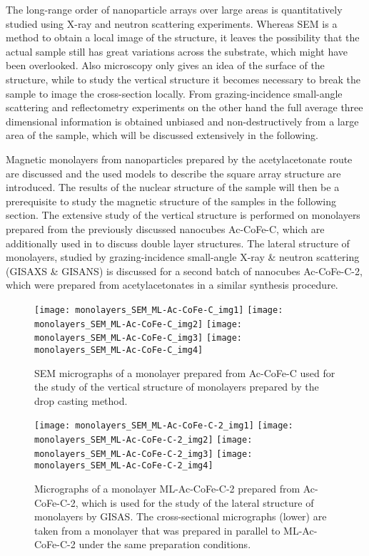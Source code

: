 \documentclass[\main/dresen_thesis.tex]{subfiles}
\begin{document}
  \label{sec:monolayers:structure:semIntro}
  The long-range order of nanoparticle arrays over large areas is quantitatively studied using X-ray and neutron scattering experiments.
  Whereas SEM is a method to obtain a local image of the structure, it leaves the possibility that the actual sample still has great variations across the substrate, which might have been overlooked.
  Also microscopy only gives an idea of the surface of the structure, while to study the vertical structure it becomes necessary to break the sample to image the cross-section locally.
  From grazing-incidence small-angle scattering and reflectometry experiments on the other hand the full average three dimensional information is obtained unbiased and non-destructively from a large area of the sample, which will be discussed extensively in the following.

  Magnetic monolayers from nanoparticles prepared by the acetylacetonate route are discussed and the used models to describe the square array structure are introduced.
  The results of the nuclear structure of the sample will then be a prerequisite to study the magnetic structure of the samples in the following section.
  The extensive study of the vertical structure is performed on monolayers prepared from the previously discussed nanocubes Ac-CoFe-C, which are additionally used in  to discuss double layer structures.
  The lateral structure of monolayers, studied by grazing-incidence small-angle X-ray \& neutron scattering (GISAXS \& GISANS) is discussed for a second batch of nanocubes Ac-CoFe-C-2, which were prepared from acetylacetonates in a similar synthesis procedure.

  \begin{figure}[tb]
    \centering
    \texttt{[image: monolayers\_SEM\_ML-Ac-CoFe-C\_img1]}
    \texttt{[image: monolayers\_SEM\_ML-Ac-CoFe-C\_img2]}
    \texttt{[image: monolayers\_SEM\_ML-Ac-CoFe-C\_img3]}
    \texttt{[image: monolayers\_SEM\_ML-Ac-CoFe-C\_img4]}
    \caption{\label{fig:monolayers:structure:semImagesMLACCoFeC}SEM micrographs of a monolayer prepared from Ac-CoFe-C used for the study of the vertical structure of monolayers prepared by the drop casting method.}
  \end{figure}

  \begin{figure}[tb]
    \centering
    \texttt{[image: monolayers\_SEM\_ML-Ac-CoFe-C-2\_img1]}
    \texttt{[image: monolayers\_SEM\_ML-Ac-CoFe-C-2\_img2]}
    \texttt{[image: monolayers\_SEM\_ML-Ac-CoFe-C-2\_img3]}
    \texttt{[image: monolayers\_SEM\_ML-Ac-CoFe-C-2\_img4]}
    \caption{\label{fig:monolayers:structure:semImagesMLACCoFeC2}Micrographs of a monolayer ML-Ac-CoFe-C-2 prepared from Ac-CoFe-C-2, which is used for the study of the lateral structure of monolayers by GISAS. The cross-sectional micrographs (lower) are taken from a monolayer that was prepared in parallel to ML-Ac-CoFe-C-2 under the same preparation conditions.}
  \end{figure}
\end{document}
